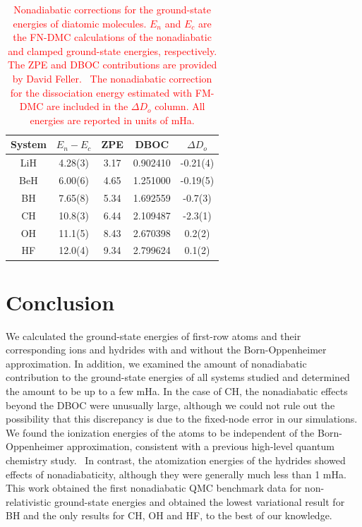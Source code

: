 \documentclass[aip,jcp,numerical,reprint]{revtex4-1}
\begin{document}
\begin{table}[h]
\setlength{\extrarowheight}{1pt}
\caption{\textcolor{red}{Nonadiabatic corrections for the ground-state energies of diatomic molecules. $E_n$ and $E_c$ are the FN-DMC calculations of the nonadiabatic and clamped ground-state energies, respectively. The ZPE and DBOC contributions are provided by David Feller.~\cite{fell1} The nonadiabatic correction for the dissociation energy estimated with FM-DMC are included in the $\Delta D_o$ column. All energies are reported in units of mHa.}\label{tab:nad-ad-diatomics}}
\begin{tabular}{ccccc}
\hline\hline
System & $E_n-E_c$ &   ZPE &      DBOC & $\Delta D_o$\\ \hline
LiH  &   4.28(3)   &  3.17 &  0.902410 & -0.21(4) \\
BeH  &   6.00(6)   &  4.65 &  1.251000 & -0.19(5) \\
BH   &   7.65(8)   &  5.34 &  1.692559 & -0.7(3) \\
CH   &   10.8(3)   &  6.44 &  2.109487 & -2.3(1) \\
OH   &   11.1(5)   &  8.43 &  2.670398 &  0.2(2) \\
HF   &   12.0(4)   &  9.34 &  2.799624 &  0.1(2) \\
\hline\hline
\end{tabular}
\end{table}

\section{Conclusion}
We calculated the ground-state energies of first-row atoms and their corresponding ions and hydrides with and without the Born-Oppenheimer approximation. In addition, we examined the amount of nonadiabatic contribution to the ground-state energies of all systems studied and determined the amount to be up to a few mHa. In the case of CH, the nonadiabatic effects beyond the DBOC were unusually large, although we could not rule out the possibility that this discrepancy is due to the fixed-node error in our simulations. %
We found the ionization energies of the atoms to be independent of the Born-Oppenheimer approximation, consistent with a previous high-level quantum chemistry study.~\cite{Klopper_IP} In contrast, the atomization energies of the hydrides showed effects of nonadiabaticity, although they were generally much less than 1 mHa. This work obtained the first nonadiabatic QMC benchmark data for non-relativistic ground-state energies and obtained the lowest variational result for BH and the only results for CH, OH and HF, to the best of our knowledge.
\end{document}
